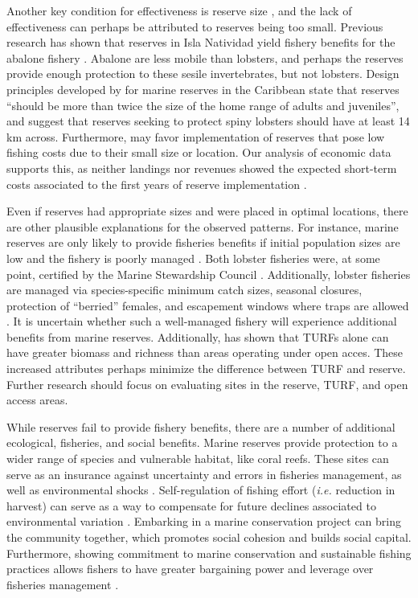 \documentclass{frontiersSCNS}
\begin{document}
Another key condition for effectiveness is reserve size
\citep{edgar_2014-UO}, and the lack of effectiveness can perhaps be
attributed to reserves being too small. Previous research has shown that
reserves in Isla Natividad yield fishery benefits for the abalone
fishery \citep{rossetto_2015-V0}. Abalone are less mobile than lobsters,
and perhaps the reserves provide enough protection to these sesile
invertebrates, but not lobsters. Design principles developed by
\citet{green_2017} for marine reserves in the Caribbean state that
reserves ``should be more than twice the size of the home range of
adults and juveniles'', and suggest that reserves seeking to protect
spiny lobsters should have at least 14 km across. Furthermore, may favor
implementation of reserves that pose low fishing costs due to their
small size or location. Our analysis of economic data supports this, as
neither landings nor revenues showed the expected short-term costs
associated to the first years of reserve implementation
\citep{ovando_2016-Wg}.

Even if reserves had appropriate sizes and were placed in optimal
locations, there are other plausible explanations for the observed
patterns. For instance, marine reserves are only likely to provide
fisheries benefits if initial population sizes are low and the fishery
is poorly managed \citep{hilborn_2006}. Both lobster fisheries were, at
some point, certified by the Marine Stewardship Council
\citep{prezramrez_2016-J1}. Additionally, lobster fisheries are managed
via species-specific minimum catch sizes, seasonal closures, protection
of ``berried'' females, and escapement windows where traps are allowed
\citep{dof_website_1993}. It is uncertain whether such a well-managed
fishery will experience additional benefits from marine reserves.
Additionally, \citet{gelcich_2008} has shown that TURFs alone can have
greater biomass and richness than areas operating under open acces.
These increased attributes perhaps minimize the difference between TURF
and reserve. Further research should focus on evaluating sites in the
reserve, TURF, and open access areas.

While reserves fail to provide fishery benefits, there are a number of
additional ecological, fisheries, and social benefits. Marine reserves
provide protection to a wider range of species and vulnerable habitat,
like coral reefs. These sites can serve as an insurance against
uncertainty and errors in fisheries management, as well as environmental
shocks \citep{hilborn_2004,hilborn_2006,micheli_2012-EU}.
Self-regulation of fishing effort (\emph{i.e.} reduction in harvest) can
serve as a way to compensate for future declines associated to
environmental variation \citep{finkbeiner_2018}. Embarking in a marine
conservation project can bring the community together, which promotes
social cohesion and builds social capital. Furthermore, showing
commitment to marine conservation and sustainable fishing practices
allows fishers to have greater bargaining power and leverage over
fisheries management \citep{prezramrez_2012}.
\end{document}
